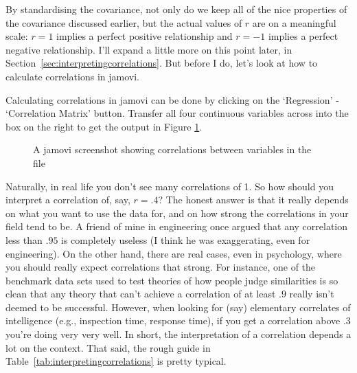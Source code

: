 By standardising the covariance, not only do we keep all of the nice properties of the covariance discussed earlier, but the actual values of $r$ are on a meaningful scale: $r= 1$ implies a perfect positive relationship and $r = -1$ implies a perfect negative relationship. I'll expand a little more on this point later, in Section~\ref{sec:interpretingcorrelations}. But before I do, let's look at how to calculate correlations in jamovi.


Calculating correlations in jamovi can be done by clicking on the `Regression' - `Correlation Matrix' button. Transfer all four continuous variables across into the box on the right to get the output in Figure \ref{fig:correlations}.

\vspace{1cm}
\begin{figure}[!htb]
\begin{center}
\caption{A jamovi screenshot showing correlations between variables in the  file}
\label{fig:correlations}
\HR
\end{center}
\end{figure}

 
Naturally, in real life you don't see many correlations of 1. So how should you interpret a correlation of, say, $r= .4$? The honest answer is that it really depends on what you want to use the data for, and on how strong the correlations in your field tend to be. A  friend of mine in engineering once argued that any correlation less than $.95$ is completely useless (I think he was exaggerating, even for engineering). On the other hand, there are real cases, even in psychology, where you should really expect correlations that strong. For instance, one of the benchmark data sets used to test theories of how people judge similarities is so clean that any theory that can't achieve a correlation of at least $.9$ really isn't deemed to be successful. However, when looking for (say) elementary correlates of intelligence (e.g., inspection time, response time), if you get a correlation above $.3$ you're doing very very well. In short, the interpretation of a correlation depends a lot on the context. That said, the rough guide in Table~\ref{tab:interpretingcorrelations} is pretty typical.

